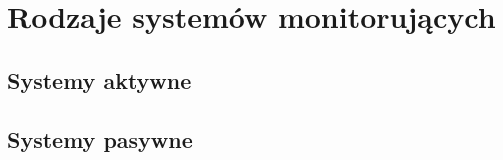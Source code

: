 \chapter{Rodzaje systemów monitorujących}

\section[Systemy aktywne][Systemy aktywne]{Systemy aktywne}

\section[Systemy pasywne][Systemy pasywne]{Systemy pasywne}


